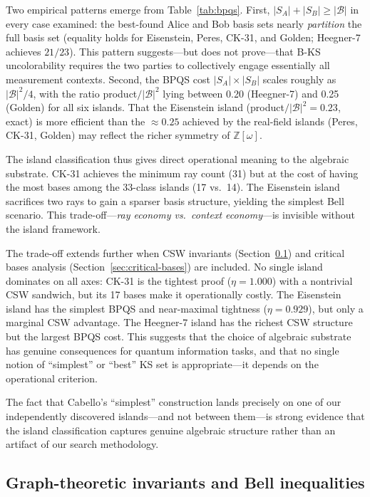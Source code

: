 \documentclass[12pt,a4paper]{article}
\newcommand{\Z}{\mathbb{Z}}
\begin{document}
\noindent Two empirical patterns emerge from Table~\ref{tab:bpqs}. First, $|S_A| + |S_B| \geq |\mathcal{B}|$ in every case examined: the best-found Alice and Bob basis sets nearly \emph{partition} the full basis set (equality holds for Eisenstein, Peres, CK-31, and Golden; Heegner-7 achieves $21/23$). This pattern suggests---but does not prove---that B-KS uncolorability requires the two parties to collectively engage essentially all measurement contexts. Second, the BPQS cost $|S_A| \times |S_B|$ scales roughly as $|\mathcal{B}|^2/4$, with the ratio product$/|\mathcal{B}|^2$ lying between 0.20 (Heegner-7) and 0.25 (Golden) for all six islands. That the Eisenstein island (product$/|\mathcal{B}|^2 = 0.23$, exact) is more efficient than the $\approx 0.25$ achieved by the real-field islands (Peres, CK-31, Golden) may reflect the richer symmetry of $\Z[\omega]$.

The island classification thus gives direct operational meaning to the algebraic substrate. CK-31 achieves the minimum ray count (31) but at the cost of having the most bases among the 33-class islands (17 vs.\ 14). The Eisenstein island sacrifices two rays to gain a sparser basis structure, yielding the simplest Bell scenario. This trade-off---\emph{ray economy vs.\ context economy}---is invisible without the island framework.

The trade-off extends further when CSW invariants (Section~\ref{sec:csw}) and critical bases analysis (Section~\ref{sec:critical-bases}) are included. No single island dominates on all axes: CK-31 is the tightest proof ($\eta = 1.000$) with a nontrivial CSW sandwich, but its 17 bases make it operationally costly. The Eisenstein island has the simplest BPQS and near-maximal tightness ($\eta = 0.929$), but only a marginal CSW advantage. The Heegner-7 island has the richest CSW structure but the largest BPQS cost. This suggests that the choice of algebraic substrate has genuine consequences for quantum information tasks, and that no single notion of ``simplest'' or ``best'' KS set is appropriate---it depends on the operational criterion.

The fact that Cabello's ``simplest'' construction lands precisely on one of our independently discovered islands---and not between them---is strong evidence that the island classification captures genuine algebraic structure rather than an artifact of our search methodology.

\subsection{Graph-theoretic invariants and Bell inequalities}\label{sec:csw}
\end{document}
